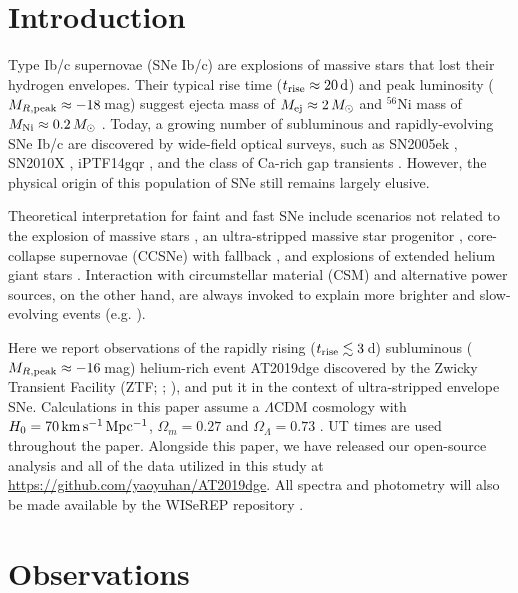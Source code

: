 \documentclass[twocolumn]{aastex63}
\begin{document}
\begin{CJK*}{UTF8}{gbsn}
\vspace{1em}

\section{Introduction}
Type Ib/c supernovae (SNe Ib/c) are explosions of massive stars that lost their 
hydrogen envelopes. Their typical rise time ($t_{\rm rise}\approx 20\,{\rm d}$) and peak luminosity 
($M_{R\rm , peak} \approx -18$\,mag) suggest ejecta mass of $M_{\rm ej}\approx 2\, M_\odot$ and 
$^{56}$Ni mass 
of $M_{\rm Ni}\approx 0.2\, M_\odot$ \citep{Drout2011, Prentice2019}. Today, a growing number of 
subluminous and rapidly-evolving SNe Ib/c are discovered by wide-field optical surveys, such as 
SN2005ek \citep{Drout2013}, SN2010X \citep{Kasliwal2010}, iPTF14gqr \citep{De2018}, and the class of 
Ca-rich gap transients \citep{Kasliwal2012}. However, the physical origin of this population of SNe still 
remains largely elusive. 

Theoretical interpretation for faint and fast SNe include scenarios not related to the explosion of 
massive stars \citep{Shen2010, Sim2012, Metzger2009, Margalit2016}, an ultra-stripped massive star 
progenitor \citep{Tauris2015}, core-collapse supernovae (CCSNe) with fallback \citep{Moriya2010}, and
explosions of extended helium giant stars \citep{KleiserFuller2018}. Interaction with circumstellar 
material (CSM) and alternative power sources, on the other hand, are always invoked to explain 
more brighter and slow-evolving events (e.g. \citealt{Chevalier2011, Hotokezaka2017}).

Here we report observations of the rapidly rising ($t_{\rm rise}\lesssim3$\,d) subluminous ($M_{R\rm , 
peak} \approx -16$\,mag) helium-rich event AT2019dge discovered by the Zwicky Transient Facility 
(ZTF; \citealt{Bellm2019b};  \citealt{Graham2019}), and put it in the context of ultra-stripped envelope 
SNe. Calculations in this paper assume a $\Lambda$CDM cosmology with $H_0= 70 \, \rm km \, s^{-1}\, 
Mpc^{-1}$, $\Omega_m = 0.27$ and $\Omega_{\Lambda} = 0.73$ \citep{Komatsu2011}. UT times are 
used throughout the paper. Alongside this paper, we have released our open-source analysis and all of 
the data utilized in this study at \url{https://github.com/yaoyuhan/AT2019dge}. All spectra and 
photometry will also be made available by the WISeREP repository \citep{Yaron2012}.

\section{Observations} 

\end{CJK*}
\end{document}
